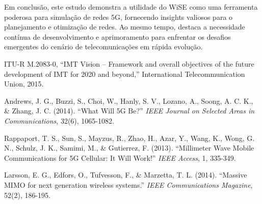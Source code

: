 \documentclass[journal]{IEEEtran}
\begin{document}
Em conclusão, este estudo demonstra a utilidade do WiSE como uma ferramenta poderosa para simulação de redes 5G, fornecendo insights valiosos para o planejamento e otimização de redes. Ao mesmo tempo, destaca a necessidade contínua de desenvolvimento e aprimoramento para enfrentar os desafios emergentes do cenário de telecomunicações em rápida evolução.


\begin{thebibliography}{1}

  ITU-R M.2083-0, ``IMT Vision – Framework and overall objectives of the future development of IMT for 2020 and beyond,'' International Telecommunication Union, 2015.
  
  Andrews, J. G., Buzzi, S., Choi, W., Hanly, S. V., Lozano, A., Soong, A. C. K., \& Zhang, J. C. (2014). ``What Will 5G Be?'' \textit{IEEE Journal on Selected Areas in Communications}, 32(6), 1065-1082.
  
  Rappaport, T. S., Sun, S., Mayzus, R., Zhao, H., Azar, Y., Wang, K., Wong, G. N., Schulz, J. K., Samimi, M., \& Gutierrez, F. (2013). ``Millimeter Wave Mobile Communications for 5G Cellular: It Will Work!'' \textit{IEEE Access}, 1, 335-349.
  
  Larsson, E. G., Edfors, O., Tufvesson, F., \& Marzetta, T. L. (2014). ``Massive MIMO for next generation wireless systems.'' \textit{IEEE Communications Magazine}, 52(2), 186-195.
  
\end{thebibliography}
\end{document}
